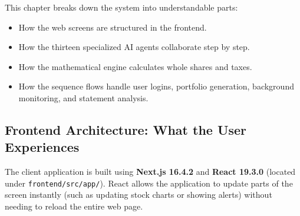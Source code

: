 This chapter breaks down the system into understandable parts:
\begin{itemize}
    \item How the web screens are structured in the frontend.
    \item How the thirteen specialized AI agents collaborate step by step.
    \item How the mathematical engine calculates whole shares and taxes.
    \item How the sequence flows handle user logins, portfolio generation, background monitoring, and statement analysis.
\end{itemize}

\subsection{Frontend Architecture: What the User Experiences}
The client application is built using \textbf{Next.js 16.4.2} and \textbf{React 19.3.0} (located under \texttt{frontend/src/app/}). React allows the application to update parts of the screen instantly (such as updating stock charts or showing alerts) without needing to reload the entire web page.

